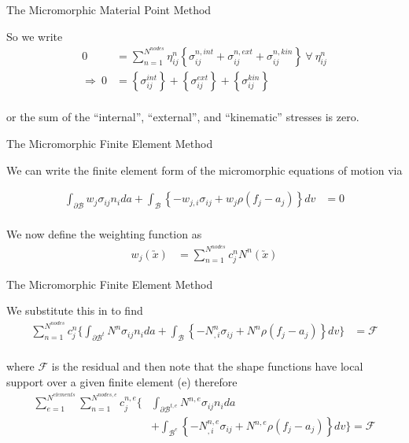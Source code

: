 \documentclass[11pt]{beamer}
\newcommand{\VEC}[1]{\utilde{#1}}
\begin{document}
\begin{frame}{The Micromorphic Material Point Method}

So we write
\begin{align*}
0 &= \sum_{n=1}^{N^{nodes}} \eta_{ij}^n \left\{\sigma_{ij}^{n,int} + \sigma_{ij}^{n,ext} + \sigma_{ij}^{n,kin}\right\}\ \forall\ \eta_{ij}^n\\
\Rightarrow\ 0 &= \left\{\sigma_{ij}^{int}\right\} + \left\{\sigma_{ij}^{ext}\right\} + \left\{\sigma_{ij}^{kin}\right\}\\
\end{align*}

or the sum of the ``internal'', ``external'', and ``kinematic'' stresses is zero.

\end{frame}

\begin{frame}{The Micromorphic Finite Element Method}

We can write the finite element form of the micromorphic equations of motion via

\begin{align*}
\int_{\partial \mathcal{B}} w_j \sigma_{ij} n_i da + \int_{\mathcal{B}} \left\{- w_{j,i} \sigma_{ij} + w_j \rho \left(f_j - a_j\right) \right\} dv &= 0\\
\end{align*}

We now define the weighting function as
\begin{align*}
w_j\left(\VEC{x}\right) &= \sum_{n=1}^{N^{nodes}} c^n_j N^n \left(\VEC{x}\right)
\end{align*}

\end{frame}

\begin{frame}{The Micromorphic Finite Element Method}

We substitute this in to find
\begin{align*}
\sum_{n=1}^{N^{nodes}} c^n_j \bigg\{\int_{\partial \mathcal{B}^t} N^n \sigma_{ij} n_i da + \int_{\mathcal{B}} \left\{- N^n_{,i} \sigma_{ij} + N^n \rho \left(f_j - a_j\right) \right\} dv\bigg\} &= \mathcal{F}\\
\end{align*}

where $\mathcal{F}$ is the residual and then note that the shape functions have local support over a given finite element (e) therefore
\begin{align*}
\sum_{e=1}^{N^{elements}} \sum_{n=1}^{N^{nodes,e}} c^{n,e}_j \bigg\{&\int_{\partial \mathcal{B}^{t,e}} N^{n,e} \sigma_{ij} n_i da\\
& + \int_{\mathcal{B}^e} \left\{- N^{n,e}_{,i} \sigma_{ij} + N^{n,e} \rho \left(f_j - a_j\right) \right\} dv\bigg\} = \mathcal{F}\\
\end{align*}

\end{frame}
\end{document}
